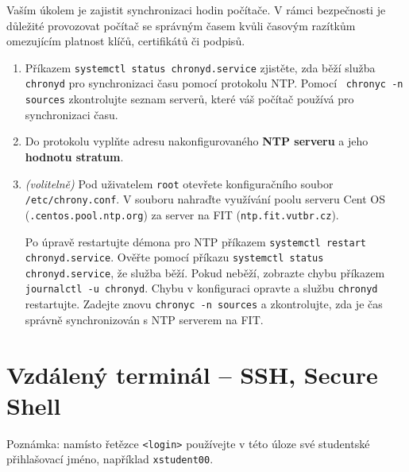\documentclass[a4paper,11pt]{article}
\begin{document}
Vaším úkolem je zajistit synchronizaci hodin počítače. V rámci bezpečnosti je
důležité provozovat počítač se správným časem kvůli časovým razítkům
omezujícím platnost klíčů, certifikátů či podpisů.

\begin{enumerate}
  \item Příkazem {\tt systemctl status chronyd.service} zjistěte, zda běží služba
    \texttt{chronyd} pro synchronizaci času pomocí protokolu NTP. Pomocí {\tt
    chronyc -n sources} zkontrolujte seznam serverů, které váš počítač používá
    pro synchronizaci času.

  \item Do protokolu vyplňte adresu nakonfigurovaného \textbf{NTP serveru} a jeho \textbf{hodnotu stratum}.

  \item \textit{(volitelně)} Pod uživatelem \texttt{root} otevřete
    konfiguračního soubor {\tt /etc/chrony.conf}. V souboru
    nahraďte využívání poolu serveru Cent OS ({\tt *.centos.pool.ntp.org}) za
    server na FIT ({\tt ntp.fit.vutbr.cz}).

    Po úpravě restartujte démona pro NTP příkazem {\tt systemctl restart chronyd.service}.
    Ověřte pomocí příkazu {\tt systemctl status chronyd.service}, že služba běží. Pokud
    neběží, zobrazte chybu příkazem {\tt journalctl -u chronyd}. Chybu v konfiguraci opravte a službu {\tt chronyd} restartujte. Zadejte znovu {\tt chronyc -n sources} a zkontrolujte, zda je čas správně synchronizován s NTP serverem na FIT.

\end{enumerate}

\section{Vzdálený terminál -- SSH, Secure Shell}

Poznámka: namísto řetězce {\tt <login>} používejte v této úloze své studentské přihlašovací jméno, například {\tt xstudent00}.
\end{document}
